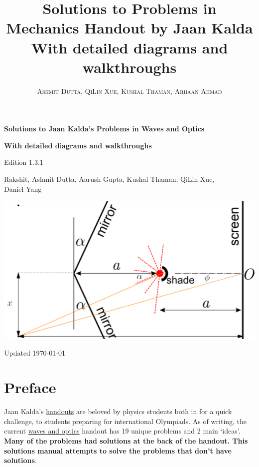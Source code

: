 \documentclass[11pt]{article}
\title{Solutions to Problems in Mechanics Handout by Jaan Kalda With detailed diagrams and walkthroughs}
\author{\textsc{Ashmit Dutta, QiLin Xue, Kushal Thaman, Arhaan Ahmad}}
\begin{document}
\begin{titlepage}
    \begin{center}
        \vspace*{1cm}
 
        \Huge
        \textbf{Solutions to Jaan Kalda's Problems in Waves and Optics}
 
        \vspace{0.5cm}
        \LARGE
        \textbf{With detailed diagrams and walkthroughs}
        
        \vspace{0.1cm}
        Edition 1.3.1
        
        \vspace{1.2cm}
 
          Rakshit, Ashmit Dutta, Aarush Gupta,  Kushal Thaman, QiLin Xue, \\Daniel Yang
        \vspace{10mm}
\begin{center}
\includegraphics[width=15cm]{title.png}
\end{center}
        \vfill
        
        \Large
        Updated
        \today
 
    \end{center}
\end{titlepage}
\newpage
\section*{Preface}
\vspace{-5mm}
\indent Jaan Kalda's \href{https://www.ioc.ee/~kalda/ipho/}{handouts} are beloved by physics students both in for a quick challenge, to students preparing for international Olympiads. As of writing, the current \href{https://www.ioc.ee/~kalda/ipho/waveopt.pdf}{waves and optics} handout has 19 unique problems and 2 main `ideas'. \textbf{Many of the problems had solutions at the back of the handout. This solutions manual attempts to solve the problems that don't have solutions}.
\end{document}
